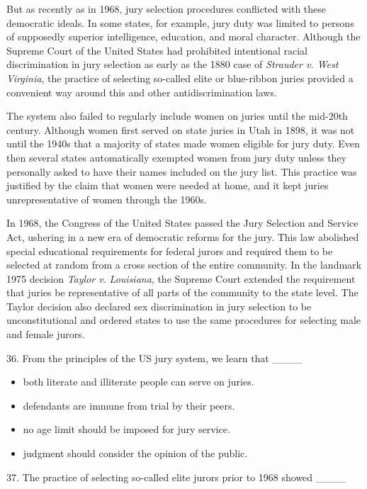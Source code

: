 \documentclass[UTF8,11pt]{ctexart}
\begin{document}
But as recently as in 1968, jury selection procedures conflicted with these democratic ideals. In some states, for example, jury duty was limited to persons of supposedly superior intelligence, education, and moral character. Although the Supreme Court of the United States had prohibited intentional racial discrimination in jury selection as early as the 1880 case of \textit{Strauder v. West Virginia}, the practice of selecting so-called elite or blue-ribbon juries provided a convenient way around this and other antidiscrimination laws.


The system also failed to regularly include women on juries until the mid-20th century. Although women first served on state juries in Utah in 1898, it was not until the 1940s that a majority of states made women eligible for jury duty. Even then several states automatically exempted women from jury duty unless they personally asked to have their names included on the jury list. This practice was justified by the claim that women were needed at home, and it kept juries unrepresentative of women through the 1960s.


In 1968, the Congress of the United States passed the Jury Selection and Service Act, ushering in a new era of democratic reforms for the jury. This law abolished special educational requirements for federal jurors and required them to be selected at random from a cross section of the entire community. In the landmark 1975 decision \textit{Taylor v.} \textit{Louisiana}, the Supreme Court extended the requirement that juries be representative of all parts of the community to the state level. The Taylor decision also declared sex discrimination in jury selection to be unconstitutional and ordered states to use the same procedures for selecting male and female jurors.


36. From the principles of the US jury system, we learn that \_\_\_\_


\begin{itemize}[leftmargin=2em,itemsep=.2em,topsep=.4em]\item[A.] both literate and illiterate people can serve on juries.
\item[B.] defendants are immune from trial by their peers.
\item[C.] no age limit should be imposed for jury service.
\item[D.] judgment should consider the opinion of the public.
\end{itemize}

37. The practice of selecting so-called elite jurors prior to 1968 showed \_\_\_\_
\end{document}
